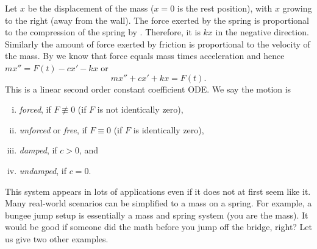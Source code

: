 Let $x$ be the displacement of the mass ($x=0$ is the rest position), with
$x$ growing to the right (away from the wall).
The force exerted by the spring is proportional to the
compression of the spring by .
Therefore, it is $kx$ in the negative direction.
Similarly the amount of force exerted by friction is proportional
to the velocity of the mass.
By  we know that force equals mass times acceleration
and hence $mx'' = F(t)-cx'-kx$ or
\begin{equation*}
mx'' + cx' + kx = F(t) .
\end{equation*}
This is a linear second order constant coefficient ODE\@.
We say the motion is
\begin{enumerate}[(i)]
\item \emph{forced}, if $F \not\equiv 0$ (if $F$ is not identically zero),
\item \emph{unforced} or \emph{free}, if $F \equiv 0$ (if $F$ is identically zero),
\item \emph{damped}, if $c > 0$, and
\item \emph{undamped}, if $c = 0$.
\end{enumerate}

This system appears in lots of applications even if it does not at first
seem like it.  Many real-world scenarios can be simplified to
a mass on a spring.  For example, a bungee jump setup is essentially a mass
and spring system (you are the mass).  It would be good if someone did the math
before you jump off the bridge, right?  Let us give two other examples.

\medskip

